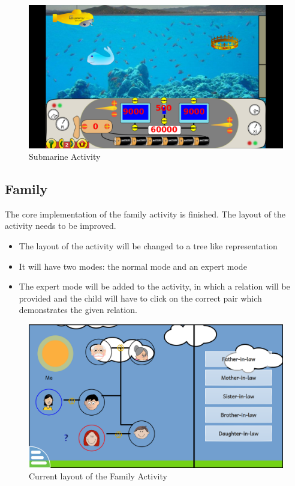 \documentclass[preprint,12pt]{elsarticle}
\begin{document}
\begin{itemize}
\begin{figure}[h]
\centering\includegraphics[width=1.0\linewidth]{submarine}
\caption{Submarine Activity}
\end{figure}

\end{itemize}

\subsection{Family}

The core implementation of the family activity is finished. The layout of the activity needs to be improved.

\begin{itemize}


\item The layout of the activity will be changed to a tree like representation
\item It will have two modes: the normal mode and an expert mode
\item The expert mode will be added to the activity, in which a relation will be provided and the child will have to click on the correct pair which demonstrates the given relation.

\end{itemize}

\begin{figure}[H]
\centering\includegraphics[width=1.0\linewidth]{family}
\caption{Current layout of the Family Activity}
\end{figure}
\end{document}
